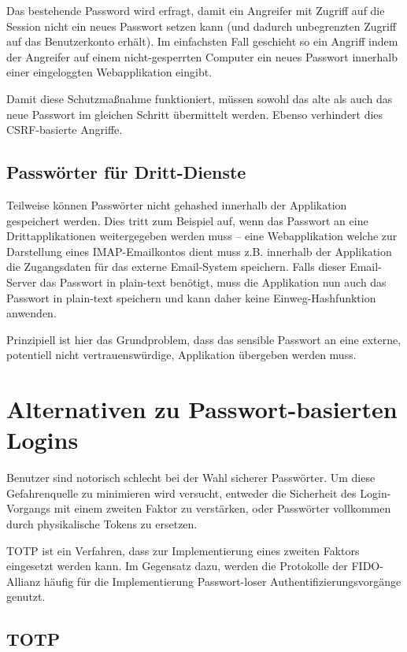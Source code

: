 Das bestehende Password wird erfragt, damit ein Angreifer mit Zugriff auf die Session nicht ein neues Passwort setzen kann (und dadurch unbegrenzten Zugriff auf das Benutzerkonto erhält). Im einfachsten Fall geschieht so ein Angriff indem der Angreifer auf einem nicht-gesperrten Computer ein neues Passwort innerhalb einer eingeloggten Webapplikation eingibt.

Damit diese Schutzmaßnahme funktioniert, müssen sowohl das alte als auch das neue Passwort im gleichen Schritt übermittelt werden. Ebenso verhindert dies CSRF-basierte Angriffe.

\subsection{Passwörter für Dritt-Dienste}

Teilweise können Passwörter nicht gehashed innerhalb der Applikation gespeichert werden. Dies tritt zum Beispiel auf, wenn das Passwort an eine Drittapplikationen weitergegeben werden muss -- eine Webapplikation welche zur Darstellung eines IMAP-Emailkontos dient muss z.B. innerhalb der Applikation die Zugangsdaten für das externe Email-System speichern. Falls dieser Email-Server das Passwort in plain-text benötigt, muss die Applikation nun auch das Passwort in plain-text speichern und kann daher keine Einweg-Hashfunktion anwenden.

Prinzipiell ist hier das Grundproblem, dass das sensible Passwort an eine externe, potentiell nicht vertrauenswürdige, Applikation übergeben werden muss.

\section{Alternativen zu Passwort-basierten Logins}

Benutzer sind notorisch schlecht bei der Wahl sicherer Passwörter. Um diese Gefahrenquelle zu minimieren wird versucht, entweder die Sicherheit des Login-Vorgangs mit einem zweiten Faktor zu verstärken, oder Passwörter vollkommen durch physikalische Tokens zu ersetzen.

TOTP ist ein Verfahren, dass zur Implementierung eines zweiten Faktors eingesetzt werden kann. Im Gegensatz dazu, werden die Protokolle der FIDO-Allianz häufig für die Implementierung Passwort-loser Authentifizierungsvorgänge genutzt.

\subsection{TOTP}

